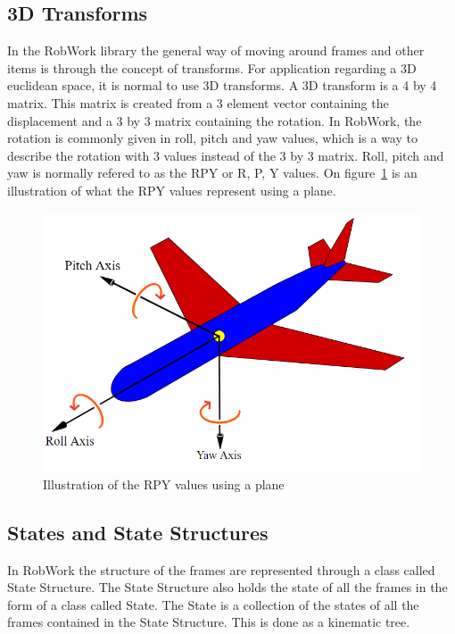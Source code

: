 \subsection{3D Transforms}
In the RobWork library the general way of moving around frames and other items is through the concept of transforms. For application regarding a 3D euclidean space, it is normal to use 3D transforms. A 3D transform is a 4 by 4 matrix. This matrix is created from a 3 element vector containing the displacement and a 3 by 3 matrix containing the rotation. In RobWork, the rotation is commonly given in roll, pitch and yaw values, which is a way to describe the rotation with 3 values instead of the 3 by 3 matrix. Roll, pitch and yaw is normally refered to as the RPY or R, P, Y values. On figure~\ref{fig:RPYExample} is an illustration of what the RPY values represent using a plane.

\begin{figure}[h]
	\centering
	\includegraphics[scale=0.55]{Figures/RPYExample.png}
	\caption{Illustration of the RPY values using a plane \cite{RPY}}
	\label{fig:RPYExample}
\end{figure}

\subsection{States and State Structures}
In RobWork the structure of the frames are represented through a class called State Structure. The State Structure also holds the state of all the frames in the form of a class called State. The State is a collection of the states of all the frames contained in the State Structure. This is done as a kinematic tree.


